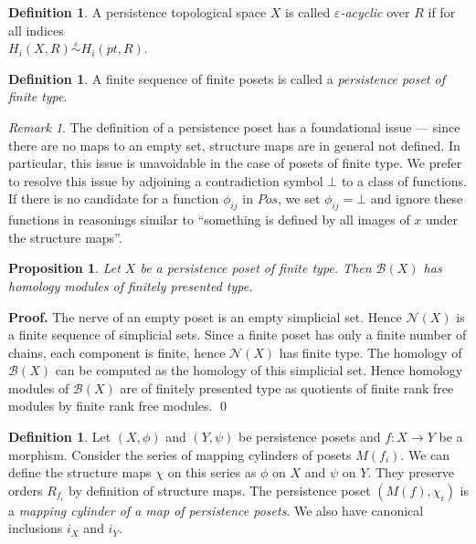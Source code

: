 \documentclass[english,12pt]{article}
\newcounter{stmcounter}[section]
\numberwithin{equation}{section}
\newtheorem{proposition}[stmcounter]{Proposition}
\theoremstyle{definition}
\newtheorem{definition}[stmcounter]{Definition}
\theoremstyle{remark}
\newtheorem{remark}[stmcounter]{Remark}
\newenvironment{pf}{\noindent\textbf{Proof.}}{\qed}
\newcommand{\define}[1]{{\textit{#1}}}
\begin{document}
\begin{definition}
  A persistence topological space $X$ is called \define{$\varepsilon$-acyclic} over $R$ if for all indices\\ $H_i(X,R) \stackrel{\varepsilon}{\sim} H_i(pt,R)$.
\end{definition}

\begin{definition}
  A finite sequence of finite posets is called a \define{persistence poset of finite type}.
\end{definition}

\begin{remark}
  The definition of a persistence poset has a foundational issue --- since there are no maps to an empty set, structure maps are in general not defined. In particular, this issue is unavoidable in the case of posets of finite type. We prefer to resolve this issue by adjoining a contradiction symbol $\bot$ to a class of functions. If there is no candidate for a function $\phi_{ij}$ in $Pos$, we set $\phi_{ij} = \bot$ and ignore these functions in reasonings similar to ``something is defined by all images of $x$ under the structure maps''.
\end{remark}

\begin{proposition}
  Let $X$ be a persistence poset of finite type. Then $\mathcal{B}(X)$ has homology modules of finitely presented type.
\end{proposition}

\begin{pf}
  The nerve of an empty poset is an empty simplicial set. Hence $\mathcal{N}(X)$ is a finite sequence of simplicial sets. Since a finite poset has only a finite number of chains, each component is finite, hence $\mathcal{N}(X)$ has finite type. The homology of $\mathcal{B}(X)$ can be computed as the homology of this simplicial set. Hence homology modules of $\mathcal{B}(X)$ are of finitely presented type as quotients of finite rank free modules by finite rank free modules.
\end{pf}\\

\begin{definition}
  Let $(X, \phi)$ and $(Y, \psi)$ be persistence posets and $f : X \to Y$ be a morphism. Consider the series of mapping cylinders of posets $M(f_i)$. We can define the structure maps $\chi$ on this series as $\phi$ on $X$ and $\psi$ on $Y$. They preserve orders $R_{f_i}$ by definition of structure maps. The persistence poset $(M(f), \chi_i)$ is a \define{mapping cylinder of a map of persistence posets}. We also have canonical inclusions $i_X$ and $i_Y$.
\end{definition}
\end{document}
